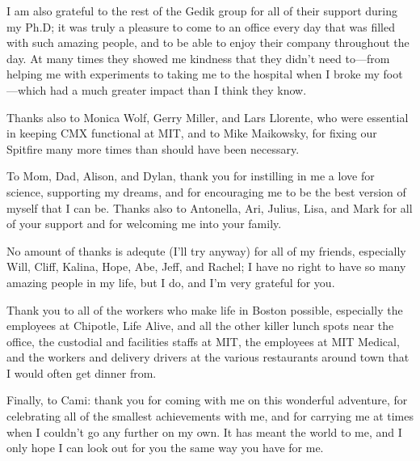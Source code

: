 I am also grateful to the rest of the Gedik group for all of their support during my Ph.D; it was truly a pleasure to come to an office every day that was filled with such amazing people, and to be able to enjoy their company throughout the day.
At many times they showed me kindness that they didn't need to---from helping me with experiments to taking me to the hospital when I broke my foot---which had a much greater impact than I think they know.

Thanks also to Monica Wolf, Gerry Miller, and Lars Llorente, who were essential in keeping CMX functional at MIT, and to Mike Maikowsky, for fixing our Spitfire many more times than should have been necessary.

To Mom, Dad, Alison, and Dylan, thank you for instilling in me a love for science, supporting my dreams, and for encouraging me to be the best version of myself that I can be.
Thanks also to Antonella, Ari, Julius, Lisa, and Mark for all of your support and for welcoming me into your family.

No amount of thanks is adequte (I'll try anyway) for all of my friends, especially Will, Cliff, Kalina, Hope, Abe, Jeff, and Rachel; I have no right to have so many amazing people in my life, but I do, and I'm very grateful for you.

Thank you to all of the workers who make life in Boston possible, especially the employees at Chipotle, Life Alive, and all the other killer lunch spots near the office, the custodial and facilities staffs at MIT, the employees at MIT Medical, and the workers and delivery drivers at the various restaurants around town that I would often get dinner from.

Finally, to Cami: thank you for coming with me on this wonderful adventure, for celebrating all of the smallest achievements with me, and for carrying me at times when I couldn't go any further on my own.
It has meant the world to me, and I only hope I can look out for you the same way you have for me.




